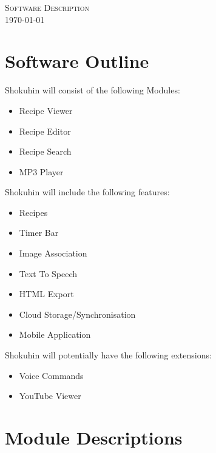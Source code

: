 \documentclass[a4paper, 12pt]{article}
\author{Shaylen Pastakia}
\begin{document}
\begin{titlepage}
\center
\textsc{\Huge Software Description}\\[5cm]
{\large \today}\\[2cm]
\end{titlepage}
\tableofcontents

\newpage
\section{Software Outline}
Shokuhin will consist of the following Modules:
\begin{itemize}
\item Recipe Viewer
\item Recipe Editor
\item Recipe Search
\item MP3 Player
\end{itemize}
Shokuhin will include the following features:
\begin{itemize}
\item Recipes
\item Timer Bar
\item Image Association
\item Text To Speech
\item HTML Export
\item Cloud Storage/Synchronisation
\item Mobile Application
\end{itemize}
Shokuhin will potentially have the following extensions:
\begin{itemize}
\item Voice Commands
\item YouTube Viewer
\end{itemize}

\newpage
\section{Module Descriptions}
\end{document}
